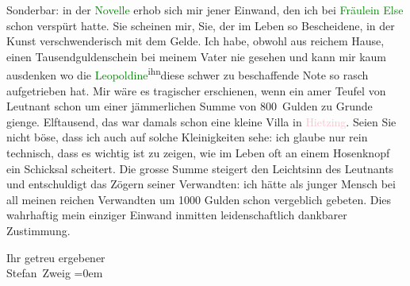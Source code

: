\pstart
           Sonderbar: in der \textcolor{green}{Novelle}{}\ledrightnote{{$\rightarrow$}\textcolor{green}{Spiel im Morgengrauen. Novelle}}
               erhob sich mir jener Einwand, den ich bei \textcolor{green}{Fräulein
                  Else}{}\ledrightnote{\textcolor{green}{Fräulein Else}} schon verspürt hatte. Sie scheinen mir, Sie, der im Leben so
               Bescheidene, in der Kunst verschwenderisch mit dem Gelde. Ich habe, obwohl aus
               reichem Hause, einen Tausendguldenschein \introOben{}bei meinem Vater\introOben{}
               nie gesehen und kann mir kaum ausdenken wo die \textcolor{green}{Leopoldine}{}\ledrightnote{{$\rightarrow$}\textcolor{green}{Spiel im Morgengrauen. Novelle}}{ }\substVorne{}\textsuperscript{ihn}\substDazwischen{}diese schwer zu beschaffende Note so rasch\substHinten{} aufgetrieben hat. Mir wäre es tragischer erschienen, wenn ein amer Teufel
               von Leutnant schon um einer jämmerlichen Summe von 800 Gulden zu Grunde gienge.
               Elftausend, das war damals schon eine \introOben{}kleine\introOben{} Villa in \textcolor{pink}{Hietzing}{}\ledrightnote{\textcolor{pink}{XIII., Hietzing}}. Seien Sie nicht böse, dass ich \introOben{}auch\introOben{} auf solche Kleinigkeiten sehe: ich glaube nur rein
               technisch, dass es wichtig ist zu zeigen, wie im Leben oft an einem Hosenknopf ein
               Schicksal scheitert. Die grosse Summe steigert den Leichtsinn des Leutnants und
               entschuldigt das Zögern seiner Verwandten: ich hätte als junger Mensch bei all meinen
               reichen Verwandten um 1000 Gulden schon vergeblich gebeten. Dies wahrhaftig mein
               einziger Einwand inmitten leidenschaftlich dankbarer Zustimmung.\pend
           
\pstart
           Ihr getreu ergebener{\\[\baselineskip]}\spacefill\mbox{Stefan Zweig}\pend
           \leftskip=0em{}\endnumbering{}
\begin{anhang}
\end{anhang}
      